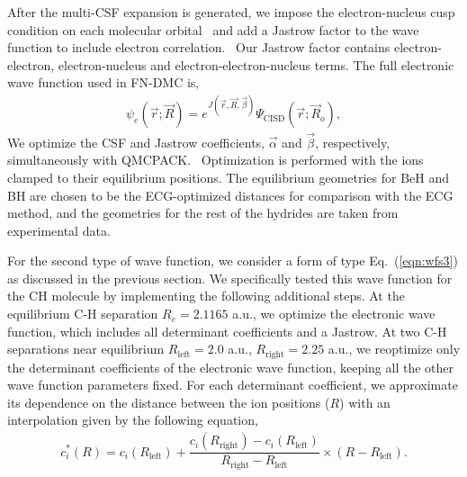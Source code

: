 \documentclass[aip,jcp,numerical,reprint]{revtex4-1}
\begin{document}
After the multi-CSF expansion is generated, we impose the electron-nucleus cusp condition on each molecular orbital~\cite{cusp} and add a Jastrow factor to the wave function to include electron correlation.~\cite{Kato} Our Jastrow factor contains electron-electron, electron-nucleus and electron-electron-nucleus terms. The full electronic wave function used in FN-DMC is,
\begin{align}
\psi_e(\vec{r};\vec{R})=e^{J(\vec{r},\vec{R},\vec{\beta})}\Psi_{\text{CISD}}(\vec{r};\vec{R}_o)\label{eq:psie},
\end{align}
We optimize the CSF and Jastrow coefficients, $\vec{\alpha}$ and $\vec{\beta}$, respectively, simultaneously with QMCPACK.~\cite{QMCPACK_Kim,QMCPACK_Esler} Optimization is performed with the ions clamped to their equilibrium positions. The equilibrium geometries for BeH and BH are chosen to be the ECG-optimized distances for comparison with the ECG  method, and the geometries for the rest of the hydrides are taken from experimental data.~\cite{CCCBDB}

For the second type of wave function, we consider a form of type Eq.~(\ref{eqn:wfs3}) as discussed in the previous section.  We specifically tested this wave function for the CH molecule by implementing the following additional steps. At the equilibrium C-H separation $R_e=2.1165$ a.u., we optimize the electronic wave function, which includes all determinant coefficients and a Jastrow. At two C-H separations near equilibrium $R_{\text{left}}=2.0$ a.u., $R_{\text{right}}=2.25$ a.u., we reoptimize only the determinant coefficients of the electronic wave function, keeping all the other wave function parameters fixed. For each determinant coefficient, we approximate its dependence on the distance between the ion positions ($R$) with an interpolation given by the following equation,
\begin{align}
c_i^*(R) = c_i(R_{\text{left}}) + 
\dfrac{c_i(R_{\text{right}}) - c_i(R_{\text{left}})}{R_{\text{right}}-R_{\text{left}}}\times(R-R_{\text{left}}). \label{eq:interpolation}
\end{align}
\end{document}
